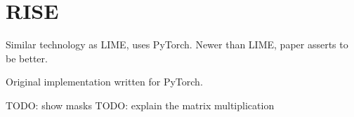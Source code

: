 \section{RISE}
Similar technology as LIME, uses PyTorch. Newer than LIME, paper asserts to be better.

Original implementation written for PyTorch.

TODO: show masks
TODO: explain the matrix multiplication

